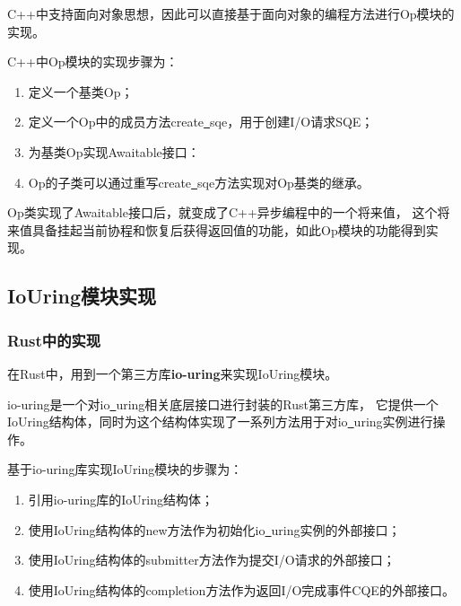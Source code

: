 \documentclass[supercite]{HustGraduPaper}
\newcommand*{\circled}[1]{\lower.7ex\hbox{\tikz\draw (0pt, 0pt)%
    circle (.5em) node {\makebox[1em][c]{\small #1}};}}
\theoremstyle{definition}
\begin{document}
C++中支持面向对象思想，因此可以直接基于面向对象的编程方法进行Op模块的实现。\par

C++中Op模块的实现步骤为：

\begin{enumerate}[label={(\arabic*)}]
  \item 定义一个基类Op；
  \item 定义一个Op中的成员方法create\underline{~}sqe，用于创建I/O请求SQE；
  \item 为基类Op实现Awaitable接口：
  \item Op的子类可以通过重写create\underline{~}sqe方法实现对Op基类的继承。
\end{enumerate}

Op类实现了Awaitable接口后，就变成了C++异步编程中的一个将来值，
这个将来值具备挂起当前协程和恢复后获得返回值的功能，如此Op模块的功能得到实现。\par

\subsection{IoUring模块实现}

\subsubsection{Rust中的实现}

在Rust中，用到一个第三方库\textbf{io-uring}来实现IoUring模块。\par

io-uring是一个对io\underline{~}uring相关底层接口进行封装的Rust第三方库，
它提供一个IoUring结构体，同时为这个结构体实现了一系列方法用于对io\underline{~}uring实例进行操作。\par

基于io-uring库实现IoUring模块的步骤为：

\begin{enumerate}[label={(\arabic*)}]
  \item 引用io-uring库的IoUring结构体；
  \item 使用IoUring结构体的new方法作为初始化io\underline{~}uring实例的外部接口；
  \item 使用IoUring结构体的submitter方法作为提交I/O请求的外部接口；
  \item 使用IoUring结构体的completion方法作为返回I/O完成事件CQE的外部接口。
\end{enumerate}
\end{document}
